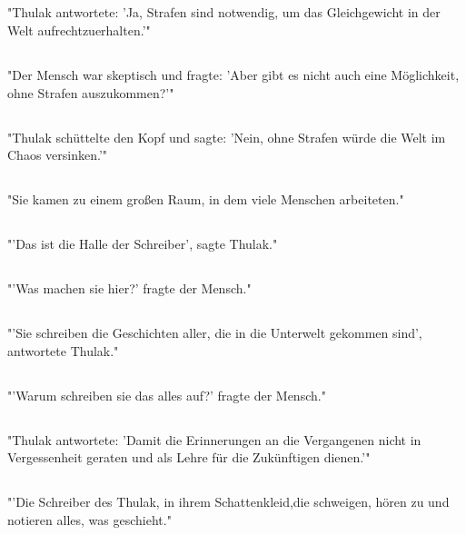 \documentclass{article}
\begin{document}
\subsection{}
"Thulak antwortete: 'Ja, Strafen sind notwendig, um das Gleichgewicht in der Welt aufrechtzuerhalten.'"
\subsection{}
"Der Mensch war skeptisch und fragte: 'Aber gibt es nicht auch eine Möglichkeit, ohne Strafen auszukommen?'"
\subsection{}
"Thulak schüttelte den Kopf und sagte: 'Nein, ohne Strafen würde die Welt im Chaos versinken.'"
\subsection{}
"Sie kamen zu einem großen Raum, in dem viele Menschen arbeiteten."
\subsection{}
"'Das ist die Halle der Schreiber', sagte Thulak."
\subsection{}
"'Was machen sie hier?' fragte der Mensch."
\subsection{}
"'Sie schreiben die Geschichten aller, die in die Unterwelt gekommen sind', antwortete Thulak."
\subsection{}
"'Warum schreiben sie das alles auf?' fragte der Mensch."
\subsection{}
"Thulak antwortete: 'Damit die Erinnerungen an die Vergangenen nicht in Vergessenheit geraten und als Lehre für die Zukünftigen dienen.'"
\subsection{}
"'Die Schreiber des Thulak, in ihrem Schattenkleid,die schweigen, hören zu und notieren alles, was geschieht."
\end{document}

